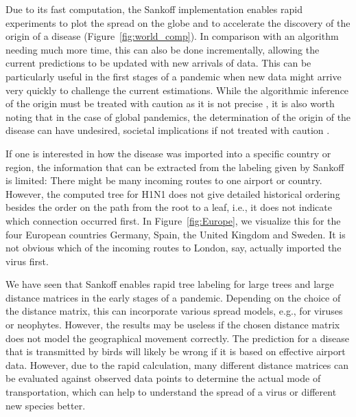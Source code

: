 \documentclass{article}
\begin{document}
Due to its fast computation, the Sankoff implementation enables rapid
experiments to plot the spread on the globe and to accelerate the discovery of
the origin of a disease (Figure~\ref{fig:world_comp}). In comparison with an
algorithm needing much more time, this can also be done incrementally, allowing
the current predictions to be updated with new arrivals of data. This can be
particularly useful in the first stages of a pandemic when new data might arrive
very quickly to challenge the current estimations. While the algorithmic
inference of the origin must be treated with caution as it is not precise
\cite{reimeringPhylogeographicReconstructionUsing2020}, it is also worth noting
that in the case of global pandemics, the determination of the origin of the
disease can have undesired, societal implications if not treated with caution
\cite{chenPotentialImpactCOVID192020}.

If one is interested in how the disease was imported into a specific country or
region, the information that can be extracted from the labeling given by Sankoff
is limited: There might be many incoming routes to one airport or country.
However, the computed tree for H1N1 does not give detailed historical ordering
besides the order on the path from the root to a leaf, i.e., it does not
indicate which connection occurred first. In Figure~\ref{fig:Europe}, we
visualize this for the four European countries Germany, Spain, the United
Kingdom and Sweden. It is not obvious which of the incoming routes to London,
say, actually imported the virus first.

We have seen that Sankoff enables rapid tree labeling for large trees and large
distance matrices in the early stages of a pandemic. Depending on the choice of
the distance matrix, this can incorporate various spread models, e.g., for
viruses or neophytes. However, the results may be useless if the chosen distance
matrix does not model the geographical movement correctly. The prediction for a
disease that is transmitted by birds will likely be wrong if it is based on
effective airport data. However, due to the rapid calculation, many different
distance matrices can be evaluated against observed data points to determine the
actual mode of transportation, which can help to understand the spread of a
virus or different new species better.
\end{document}
